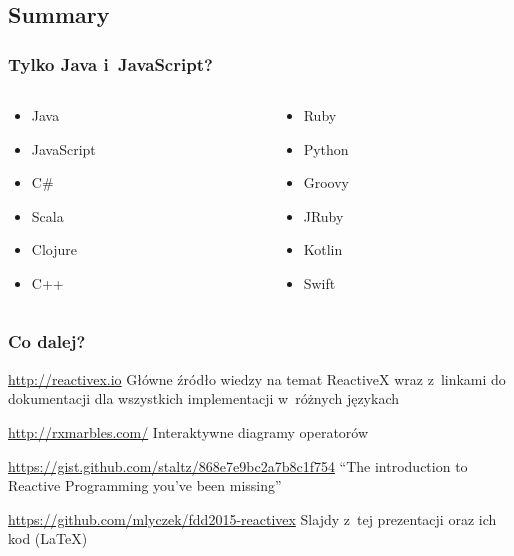 \documentclass[24pt]{beamer}
\begin{document}
\subsection{Summary}

\begin{frame}
    \frametitle{Tylko Java i~JavaScript?}

    \begin{columns}
        \begin{column}{.5\textwidth}
            \begin{itemize}
                \item Java
                \item JavaScript
                \item C\#
                \item Scala
                \item Clojure
                \item C++
            \end{itemize}
        \end{column}
        \begin{column}{.5\textwidth}
            \begin{itemize}
                \item Ruby
                \item Python
                \item Groovy
                \item JRuby
                \item Kotlin
                \item Swift
            \end{itemize}
        \end{column}
    \end{columns}
\end{frame}

\begin{frame}
    \frametitle{Co dalej?}

    \begin{block}{\url{http://reactivex.io}}
        Główne źródło wiedzy na temat ReactiveX wraz z~linkami do dokumentacji dla wszystkich implementacji w~różnych językach
    \end{block}

    \begin{block}{\url{http://rxmarbles.com/}}
        Interaktywne diagramy operatorów
    \end{block}

    \begin{block}{\url{https://gist.github.com/staltz/868e7e9bc2a7b8c1f754}}
        ``The introduction to Reactive Programming you've been missing''
    \end{block}

    \begin{block}{\url{https://github.com/mlyczek/fdd2015-reactivex}}
        Slajdy z~tej prezentacji oraz ich kod (\LaTeX)
    \end{block}

\end{frame}
\end{document}
